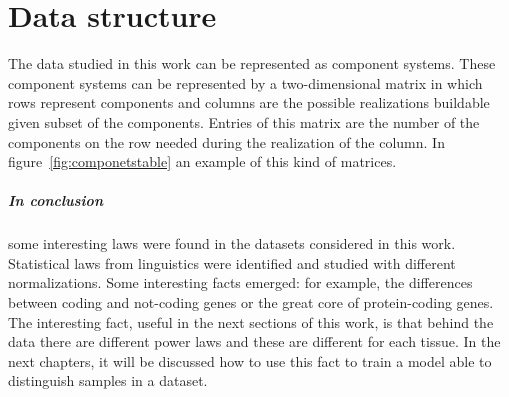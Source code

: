 \chapter{Data structure}\label{ch:structure}
The data studied in this work can be represented as component systems. These component systems can be represented by a two-dimensional matrix in which rows represent components and columns are the possible realizations buildable given subset of the components. Entries of this matrix are the number of the components on the row needed during the realization of the column. In figure~\ref{fig:componetstable} an example of this kind of matrices.









\paragraph{In conclusion} some interesting laws were found in the datasets considered in this work. Statistical laws from linguistics were identified and studied with different normalizations. Some interesting facts emerged: for example, the differences between coding and not-coding genes or the great core of protein-coding genes. The interesting fact, useful in the next sections of this work, is that behind the data there are different power laws and these are different for each tissue. In the next chapters, it will be discussed how to use this fact to train a model able to distinguish samples in a dataset. 